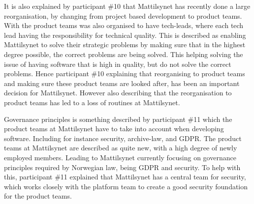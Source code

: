 It is also explained by participant \#10 that Mattilsynet has recently done a large reorganisation, by changing from project based development to product teams. With the product teams was also organised to have tech-leads, where each tech lead having the responsibility for technical quality. This is described as enabling Mattilsynet to solve their strategic problems by making sure that in the highest degree possible, the correct problems are being solved. This helping solving the issue of having software that is high in quality, but do not solve the correct problems. Hence participant \#10 explaining that reorganising to product teams and making sure these product teams are looked after, has been an important decision for Mattilsynet. However also describing that the reorganisation to product teams has led to a loss of routines at Mattilsynet.


Governance principles is something described by participant \#11 which the product teams at Mattilsynet have to take into account when developing software. Including for instance security, archive-law, and GDPR. The product teams at Mattilsynet are described as quite new, with a high degree of newly employed members. Leading to Mattilsynet currently focusing on governance principles required by Norwegian law, being GDPR and security. To help with this, participant \#11 explained that Mattilsynet has a central team for security, which works closely with the platform team to create a good security foundation for the product teams.



